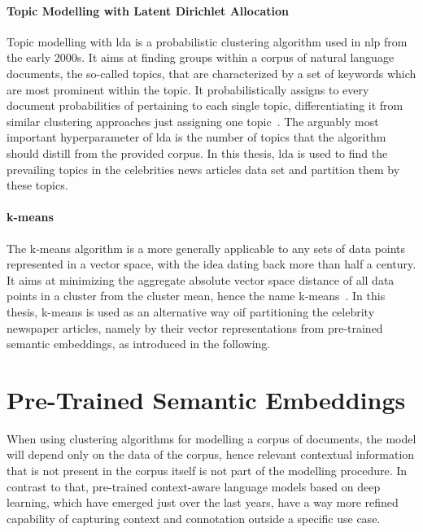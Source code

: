 \paragraph{Topic Modelling with Latent Dirichlet Allocation}\label{ch:lda}
Topic modelling with \gls{lda} is a probabilistic clustering algorithm used in \gls{nlp} from the early 2000s. It aims at finding groups within a corpus of natural language documents, the so-called topics, that are characterized by a set of keywords which are most prominent within the topic. It probabilistically assigns to every document probabilities of pertaining to each single topic, differentiating it from similar clustering approaches just assigning one topic~\autocite{blei_latent_2003, blei_probabilistic_2012}. The arguably most important hyperparameter of \gls{lda} is the number of topics that the algorithm should distill from the provided corpus. In this thesis, \gls{lda} is used to find the prevailing topics in the celebrities news articles data set and partition them by these topics.

\paragraph{k-means}
The k-means algorithm is a more generally applicable to any sets of data points represented in a vector space, with the idea dating back more than half a century. It aims at minimizing the aggregate absolute vector space distance of all data points in a cluster from the cluster mean, hence the name k-means~\autocite{macqueen_methods_1967}. In this thesis, k-means is used as an alternative way oif partitioning the celebrity newspaper articles, namely by their vector representations from pre-trained semantic embeddings, as introduced in the following.



\section{Pre-Trained Semantic Embeddings}\label{ch:pretrained_algorithms}
When using clustering algorithms for modelling a corpus of documents, the model will depend only on the data of the corpus, hence relevant contextual information that is not present in the corpus itself is not part of the modelling procedure. 
In contrast to that, pre-trained context-aware language models based on deep learning, which have emerged just over the last years, have a way more refined capability of capturing context and connotation outside a specific use case.

